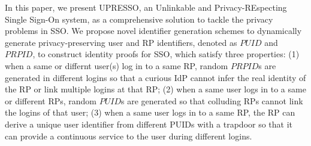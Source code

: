 \begin{comment}


Moreover, BrowserID and SPRESSO are both redesigns of SSO systems, and therefore incompatible with existing widely deployed SSO systems (e.g., OAuth, OIDC and SAML). The new SSO systems require a complicated, formal and thorough security analysis of both the designs and various implementations. As shown in~\cite{BrowserID, browseridfett2014, gilbert2013formal}, vulnerabilities have been found in the implementation of BrowserID.
\end{comment}

In this paper, we present UPRESSO, an Unlinkable and Privacy-REspecting Single Sign-On system,
as a comprehensive solution to tackle the privacy problems in SSO. We propose novel identifier generation schemes to dynamically generate  privacy-preserving user and RP identifiers, denoted as $PUID$ and $PRPID$, to construct identity proofs for SSO, which satisfy three properties: (1) when a same or differnt user(s) log in to a same RP, random $PRPID$s are generated in different logins so that a curious IdP cannot infer the real identity of the RP or link multiple logins at that RP; (2) when a same user logs in to a same or different RPs, random $PUID$s are generated so that
 colluding RPs cannot link the logins of that user; (3) when a same user logs in to a same RP, the RP can derive a unique user identifier from different PUIDs with a trapdoor so that it can provide a continuous service to the user during different logins.

